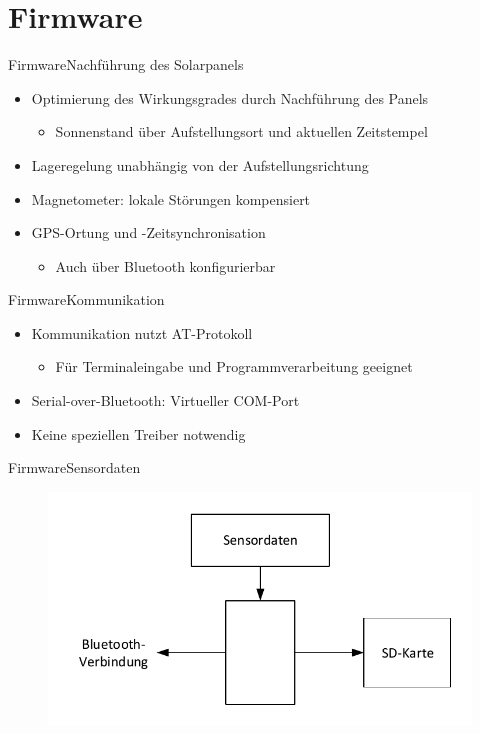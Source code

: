\documentclass{beamer}
\begin{document}
\section{Firmware}

\begin{frame}{Firmware}{Nachführung des Solarpanels}
    \begin{itemize}[<+->]
        \item Optimierung des Wirkungsgrades durch Nachführung des Panels
        \begin{itemize}
            \item Sonnenstand über Aufstellungsort und aktuellen Zeitstempel
        \end{itemize}
        \item Lageregelung unabhängig von der Aufstellungsrichtung
        \item Magnetometer: lokale Störungen kompensiert
        \item GPS-Ortung und -Zeitsynchronisation
        \begin{itemize}
            \item Auch über Bluetooth konfigurierbar
        \end{itemize}
    \end{itemize}
\end{frame}

\begin{frame}{Firmware}{Kommunikation}
    \begin{itemize}[<+->]
        \item Kommunikation nutzt AT-Protokoll
        \begin{itemize}
            \item Für Terminaleingabe und Programmverarbeitung geeignet
        \end{itemize}
        \item Serial-over-Bluetooth: Virtueller COM-Port
        \item Keine speziellen Treiber notwendig
    \end{itemize}    
\end{frame}

\begin{frame}{Firmware}{Sensordaten}
    \begin{figure}
        \centering
        \includegraphics[width=\textwidth]{./img/Datenverteilung.pdf}
    \end{figure}
\end{frame}
\end{document}
